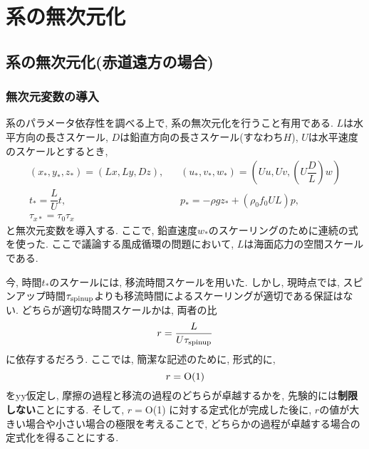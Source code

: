 \section{系の無次元化}

\subsection{系の無次元化(赤道遠方の場合)}

\subsubsection*{無次元変数の導入}
系のパラメータ依存性を調べる上で, 系の無次元化を行うこと有用である. 
$L$は水平方向の長さスケール, $D$は鉛直方向の長さスケール(すなわち$H$), 
$U$は水平速度のスケールとするとき, 
\begin{equation}
\begin{split}
   (x_*, y_*, z_*) = (Lx, Ly, Dz),& \;\;\; (u_*, v_*, w_*) = (U u, Uv, \left(U\dfrac{D}{L}\right) w) \\
   t_* = \dfrac{L}{U} t,& \;\;\; p_* = -\rho g z_* + (\rho_0 f_0 UL) p, \\
   \tau_{x*} = \tau_0 \tau_x &
\end{split}
\label{eq:scale_variable}
\end{equation}
と無次元変数を導入する. 
ここで, 鉛直速度$w_*$のスケーリングのために連続の式を使った. 
ここで議論する風成循環の問題において, $L$は海面応力の空間スケールである. 

今, 時間$t_*$のスケールには, 移流時間スケールを用いた. 
しかし, 現時点では, スピンアップ時間$\tau_{\rm spinup}$よりも移流時間によるスケーリングが適切である保証はない. 
どちらが適切な時間スケールかは, 両者の比
\begin{equation}
  r = \dfrac{L}{U\tau_{\rm spinup}}
  \label{eq:ratio_advect_EkmanSpinup_time}
\end{equation}
に依存するだろう. 
ここでは, 簡潔な記述のために, 形式的に, 
\begin{equation}
  r = {\rm O}(1)
\end{equation}
をyy仮定し, 摩擦の過程と移流の過程のどちらが卓越するかを, 先験的には\textbf{制限しない}ことにする. 
そして, $r=$O(1) に対する定式化が完成した後に, $r$の値が大きい場合や小さい場合の極限を考えることで, 
どちらかの過程が卓越する場合の定式化を得ることにする. 


